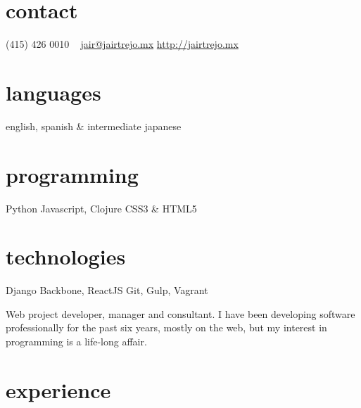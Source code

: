 \documentclass[]{friggeri-cv} %
\def\mystar{{\FA \faStar}}
\begin{document}


\begin{aside} %
\section{contact}
(415) 426 0010
~
\href{mailto:jair@jairtrejo.mx}{jair@jairtrejo.mx}
\href{http://jairtrejo.mx}{http://jairtrejo.mx}
\section{languages}
english, spanish \&
intermediate japanese
\section{programming}
{\color{red} \mystar} Python
Javascript, Clojure
CSS3 \& HTML5
\section{technologies}
Django
Backbone, ReactJS
Git, Gulp, Vagrant
\end{aside}

Web project developer, manager and consultant. I have been developing software professionally for the past six years, mostly on the web, but my interest in programming is a life-long affair.


\section{experience}

\begin{entrylist}

\end{entrylist}

\end{document}
